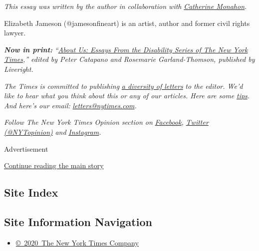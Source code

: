 \emph{This essay was written by the author in collaboration with}
\href{http://www.cxmdesigns.com/}{\emph{Catherine Monahon}}\emph{.}

Elizabeth Jameson (@jamesonfineart) is an artist, author and former
civil rights lawyer.

\emph{\textbf{Now in print:}}
\emph{``}\href{https://www.aboutusbook.com/}{\emph{About Us: Essays From
the Disability Series of The New York Times}}\emph{,'' edited by Peter
Catapano and Rosemarie Garland-Thomson, published by Liveright.}

\emph{The Times is committed to publishing}
\href{https://www.nytimes.com/2019/01/31/opinion/letters/letters-to-editor-new-york-times-women.html}{\emph{a
diversity of letters}} \emph{to the editor. We'd like to hear what you
think about this or any of our articles. Here are some}
\href{https://help.nytimes.com/hc/en-us/articles/115014925288-How-to-submit-a-letter-to-the-editor}{\emph{tips}}\emph{.
And here's our email:}
\href{mailto:letters@nytimes.com}{\emph{letters@nytimes.com}}\emph{.}

\emph{Follow The New York Times Opinion section on}
\href{https://www.facebook.com/nytopinion}{\emph{Facebook}}\emph{,}
\href{http://twitter.com/NYTOpinion}{\emph{Twitter (@NYTopinion)}}
\emph{and}
\href{https://www.instagram.com/nytopinion/}{\emph{Instagram}}\emph{.}

Advertisement

\protect\hyperlink{after-bottom}{Continue reading the main story}

\hypertarget{site-index}{%
\subsection{Site Index}\label{site-index}}

\hypertarget{site-information-navigation}{%
\subsection{Site Information
Navigation}\label{site-information-navigation}}

\begin{itemize}
\tightlist
\item
  \href{https://help.nytimes.com/hc/en-us/articles/115014792127-Copyright-notice}{©~2020~The
  New York Times Company}
\end{itemize}

